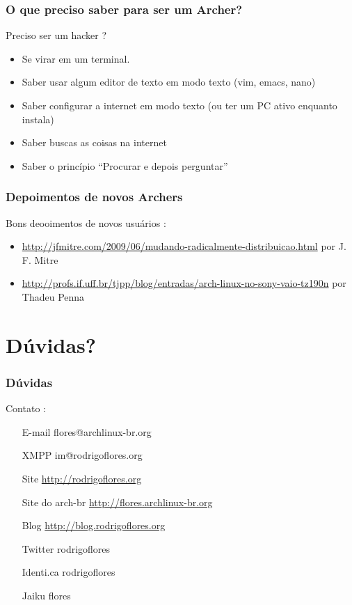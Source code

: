 \documentclass{beamer}
\begin{document}
\begin{frame}
    \frametitle{O que preciso saber para ser um Archer?}
    \begin{block}{Preciso ser um hacker ?}
        \begin{itemize}
            \item<1-> Se virar em um terminal. 
            \item<2-> Saber usar algum editor de texto em modo texto (vim, emacs, nano) 
            \item<3-> Saber configurar a internet em modo texto (ou ter um PC ativo enquanto instala)
            \item<4-> Saber buscas as coisas na internet
            \item<5-> Saber o princípio ``Procurar e depois perguntar''
        \end{itemize}
    \end{block}
\end{frame}

\begin{frame}
        \frametitle{Depoimentos de novos Archers}
        \begin{block}{Bons deooimentos de novos usuários :}
            \begin{itemize}
                \item \url{http://jfmitre.com/2009/06/mudando-radicalmente-distribuicao.html} por J. F. Mitre
                \item \url{ http://profs.if.uff.br/tjpp/blog/entradas/arch-linux-no-sony-vaio-tz190n} por Thadeu Penna
            \end{itemize}
        \end{block}
\end{frame}


\section{Dúvidas?}

\begin{frame}
    \frametitle{Dúvidas}
    \begin{block}{Contato :}
        \begin{itemize}
            \centering
            \item[E-mail] flores@archlinux-br.org        
            \item[XMPP]  im@rodrigoflores.org        
            \item[Site]  \url{http://rodrigoflores.org}
            \item[Site do arch-br]  \url{http://flores.archlinux-br.org}
            \item[Blog]  \url{http://blog.rodrigoflores.org}        
            \item[Twitter] rodrigoflores        
            \item[Identi.ca] rodrigoflores        
            \item[Jaiku] flores        
        \end{itemize}
    \end{block}

\end{frame}
\end{document}
